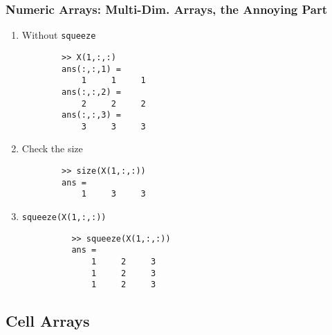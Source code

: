\documentclass{beamer}
\begin{document}
  \begin{frame}[fragile]
    \frametitle{Numeric Arrays: Multi-Dim. Arrays, the Annoying Part}

    \begin{enumerate}
      \item Without \texttt{squeeze}
        \begin{lstlisting}
        >> X(1,:,:)
        ans(:,:,1) =
            1     1     1
        ans(:,:,2) =
            2     2     2
        ans(:,:,3) =
            3     3     3
        \end{lstlisting}

      \item Check the size
        \begin{lstlisting}
        >> size(X(1,:,:))
        ans =
            1     3     3
        \end{lstlisting}\pause

      \item \texttt{squeeze(X(1,:,:))}\pause
        \begin{lstlisting}
          >> squeeze(X(1,:,:))
          ans =
              1     2     3
              1     2     3
              1     2     3
      \end{lstlisting}
    \end{enumerate}
	\end{frame}


  \subsection{Cell Arrays}
\end{document}
